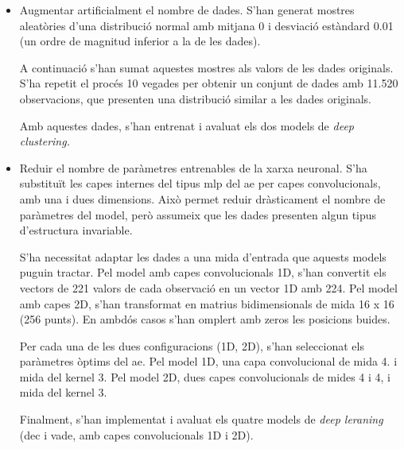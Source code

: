 \documentclass[CAT,BIB]{TFUOC}%
\begin{document}
                \begin{itemize}
                    \item Augmentar artificialment el nombre de dades.
                    S'han generat mostres aleatòries d'una distribució normal
                    amb mitjana 0 i desviació estàndard 0.01
                    (un ordre de magnitud inferior a la de les dades).

                    A continuació s'han sumat aquestes mostres als valors de les dades originals.
                    S'ha repetit el procés 10 vegades per obtenir un conjunt de dades
                    amb 11.520 observacions,
                    que presenten una distribució similar a les dades originals.

                    Amb aquestes dades,
                    s'han entrenat i avaluat els dos models de \textit{deep clustering.}

                    \item Reduir el nombre de paràmetres entrenables de la xarxa neuronal.
                    S'ha substituït les capes internes del tipus \gls{mlp} del \gls{ae}
                    per capes convolucionals, amb una i dues dimensions.
                    Això permet reduir dràsticament el nombre de paràmetres del model,
                    però assumeix que les dades presenten algun tipus d'estructura invariable.

                    S'ha necessitat adaptar les dades a una mida
                    d'entrada que aquests models puguin tractar.
                    Pel model amb capes convolucionals 1D,
                    s'han convertit els vectors de 221 valors de cada observació
                    en un vector 1D amb 224.
                    Pel model amb capes 2D,
                    s'han transformat en matrius bidimensionals de mida 16 x 16 (256 punts).
                    En ambdós casos s'han omplert amb zeros les posicions buides.

                    Per cada una de les dues configuracions (1D, 2D),
                    s'han seleccionat els paràmetres òptims del \gls{ae}.
                    Pel model 1D, una capa convolucional de mida 4. i mida del kernel 3.
                    Pel model 2D, dues capes convolucionals de mides 4 i 4, i mida del kernel 3.

                    Finalment,
                    s'han implementat i avaluat els quatre models de \textit{deep leraning}
                    (\gls{dec} i \gls{vade}, amb capes convolucionals 1D i 2D).
                \end{itemize}
\end{document}
